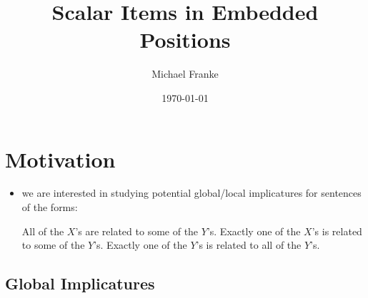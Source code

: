 \documentclass[fleqn,reqno,10pt,draft]{article}
\title{Scalar Items in Embedded Positions}
\author{Michael Franke}
\date{\today}
\begin{document}
\maketitle

\section{Motivation}

\begin{itemize}
\item we are interested in studying potential global/local
  implicatures for sentences of the forms:
  \begin{exe}
    \ex 
      \begin{xlist}
        \ex All of the $X$'s are related to some of the $Y$'s.
        \ex Exactly one of the $X$'s is related to some of the $Y$'s.
        \ex Exactly one of the $Y$'s is related to all of the $Y$'s.
      \end{xlist}
  \end{exe}
\end{itemize}

\subsection{Global Implicatures}
\label{sec:global-implicatures}
\end{document}
